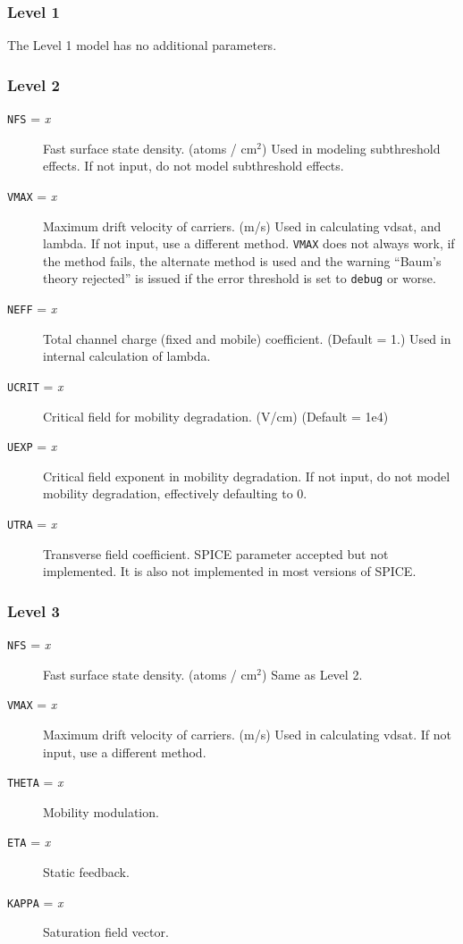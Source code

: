 \subsubsection{Level 1}

The Level 1 model has no additional parameters.

\subsubsection{Level 2}
\begin{description}

\item[{\tt NFS} = {\it x}] Fast surface state density.  (atoms / cm$^2$) 
Used in modeling subthreshold effects.  If not input, do not model
subthreshold effects.

\item[{\tt VMAX} = {\it x}] Maximum drift velocity of carriers. (m/s)
Used in calculating vdsat, and lambda.  If not input, use a different
method.  {\tt VMAX} does not always work, if the method fails, the
alternate method is used and the warning ``Baum's theory rejected'' is
issued if the error threshold is set to {\tt debug} or worse.

\item[{\tt NEFF} = {\it x}] Total channel charge (fixed and mobile)
coefficient. (Default = 1.)  Used in internal calculation of lambda.

\item[{\tt UCRIT} = {\it x}] Critical field for mobility degradation.
(V/cm) (Default = 1e4)

\item[{\tt UEXP} = {\it x}] Critical field exponent in mobility
degradation.  If not input, do not model mobility degradation,
effectively defaulting to 0.

\item[{\tt UTRA} = {\it x}] Transverse field coefficient.  SPICE 
parameter accepted but not implemented.  It is also not implemented in
most versions of SPICE.

\end{description}
\subsubsection{Level 3}
\begin{description}

\item[{\tt NFS} = {\it x}] Fast surface state density.  (atoms / cm$^2$) 
Same as Level 2.

\item[{\tt VMAX} = {\it x}] Maximum drift velocity of carriers. (m/s)
Used in calculating vdsat.  If not input, use a different method.

\item[{\tt THETA} = {\it x}] Mobility modulation.

\item[{\tt ETA} = {\it x}] Static feedback.

\item[{\tt KAPPA} = {\it x}] Saturation field vector.

\end{description}
